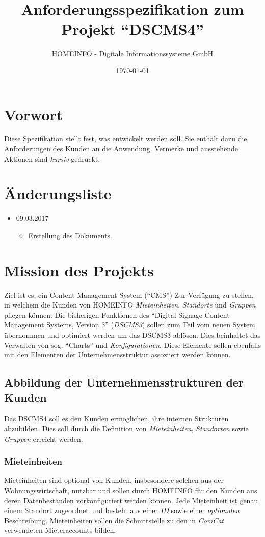 \documentclass[a4paper]{article}
\title{Anforderungsspezifikation zum Projekt \linebreak \enquote{DSCMS4}}
\author{HOMEINFO - Digitale Informationssysteme GmbH}
\date{\today}
\begin{document}
	
	\maketitle
	\pagebreak
	
	\tableofcontents
	\pagebreak
	
	\section*{Vorwort}
	Diese Spezifikation stellt fest, was entwickelt werden soll. Sie enthält dazu die Anforderungen des Kunden an die Anwendung.
	Vermerke und ausstehende Aktionen sind \emph{kursiv} gedruckt.
	\section*{Änderungsliste}
	\begin{itemize}
		\item 09.03.2017
		\begin{itemize}
			\item Erstellung des Dokuments.
		\end{itemize}
	\end{itemize}
	
	\pagebreak
	\section{Mission des Projekts}
	Ziel ist es, ein Content Management System (\enquote{CMS}) Zur Verfügung zu stellen, in welchem die Kunden von HOMEINFO \emph{Mieteinheiten}, \emph{Standorte} und \emph{Gruppen} pflegen können.
	Die bisherigen Funktionen des \enquote{Digital Signage Content Management Systems, Version 3} (\emph{DSCMS3}) sollen zum Teil vom neuen System übernommen und optimiert werden um das DSCMS3 ablösen.
	Dies beinhaltet das Verwalten von sog. \enquote{Charts} und \emph{Konfigurationen}.
	Diese Elemente sollen ebenfalls mit den Elementen der Unternehmensstruktur assoziiert werden können.
	\subsection{Abbildung der Unternehmensstrukturen der Kunden}
	Das DSCMS4 soll es den Kunden ermöglichen, ihre internen Strukturen abzubilden. Dies soll durch die Definition von \emph{Mieteinheiten}, \emph{Standorten} sowie \emph{Gruppen} erreicht werden.
	\subsubsection{Mieteinheiten}
	Mieteinheiten sind optional von Kunden, insbesondere solchen aus der Wohnungswirtschaft, nutzbar und sollen durch HOMEINFO für den Kunden aus deren Datenbeständen vorkonfiguriert werden können. Jede Mieteinheit ist genau einem Standort zugeordnet und besteht aus einer \emph{ID} sowie einer \emph{optionalen} Beschreibung. Mieteinheiten sollen die Schnittstelle zu den in \emph{ComCat} verwendeten Mieteraccounts bilden.
\end{document}
